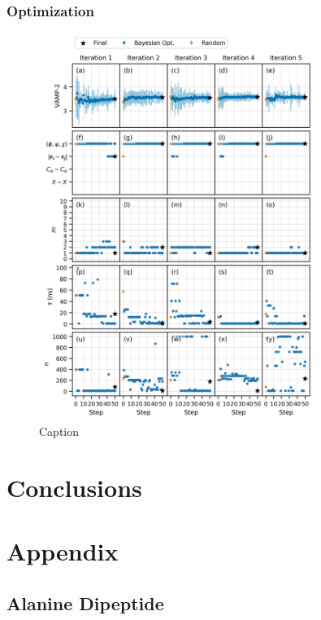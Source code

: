 \subsubsection{Optimization}


\begin{figure}
    \centering
    \includegraphics[width=0.8\textwidth]{chapters/msm_optimization/figures/aadh_opt_traj_act_s_d.png}
    \caption{Caption}
    \label{fig:aadh_opt_traj_d}
\end{figure}





\section{Conclusions}


\section{Appendix}\label{sec:msm_opt_app}

\subsection{Alanine Dipeptide}


